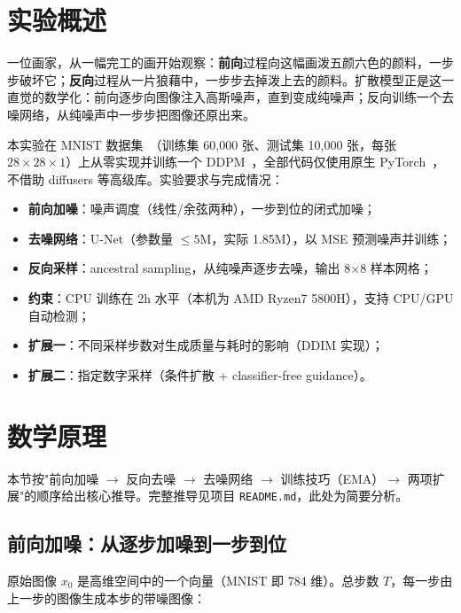 \documentclass[11pt]{article}
\begin{document}
\makereporttitle
\newpage
\tableofcontents
\newpage

\section{实验概述}

一位画家，从一幅完工的画开始观察：\textbf{前向}过程向这幅画泼五颜六色的颜料，一步步破坏它；\textbf{反向}过程从一片狼藉中，一步步去掉泼上去的颜料。扩散模型正是这一直觉的数学化：前向逐步向图像注入高斯噪声，直到变成纯噪声；反向训练一个去噪网络，从纯噪声中一步步把图像还原出来。

本实验在 MNIST 数据集~\parencite{lecun1998gradient}（训练集 60,000 张、测试集 10,000 张，每张 $28\times28\times1$）上从零实现并训练一个 DDPM~\parencite{ho2020denoising}，全部代码仅使用原生 PyTorch~\parencite{paszke2019pytorch}，不借助 diffusers 等高级库。实验要求与完成情况：

\begin{itemize}
    \item \textbf{前向加噪}：噪声调度（线性/余弦两种），一步到位的闭式加噪；
    \item \textbf{去噪网络}：U-Net（参数量 $\leq 5$M，实际 1.85M），以 MSE 预测噪声并训练；
    \item \textbf{反向采样}：ancestral sampling，从纯噪声逐步去噪，输出 8$\times$8 样本网格；
    \item \textbf{约束}：CPU 训练在 2h 水平（本机为 AMD Ryzen7 5800H），支持 CPU/GPU 自动检测；
    \item \textbf{扩展一}：不同采样步数对生成质量与耗时的影响（DDIM 实现）；
    \item \textbf{扩展二}：指定数字采样（条件扩散 + classifier-free guidance）。
\end{itemize}

\section{数学原理}

本节按"前向加噪 $\rightarrow$ 反向去噪 $\rightarrow$ 去噪网络 $\rightarrow$ 训练技巧（EMA）$\rightarrow$ 两项扩展"的顺序给出核心推导。完整推导见项目 \texttt{README.md}，此处为简要分析。

\subsection{前向加噪：从逐步加噪到一步到位}

原始图像 $x_0$ 是高维空间中的一个向量（MNIST 即 784 维）。总步数 $T$，每一步由上一步的图像生成本步的带噪图像：
\end{document}
